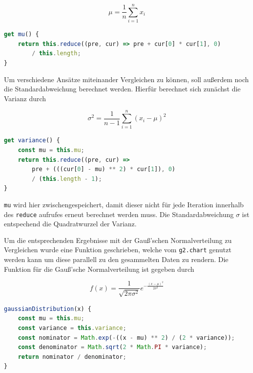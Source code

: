 \begin{equation}
    \mu = \frac{1}{n} \sum_{i=1}^n{x_i}
\end{equation}

\begin{lstlisting}[language=JavaScript, caption={Definition der \lstinline{mu} Funktion, welche den Erwartungswert der Daten in \lstinline{Data} berechnet.},label={lst:data_mu}]
get mu() {
    return this.reduce((pre, cur) => pre + cur[0] * cur[1], 0)
        / this.length;
}
\end{lstlisting}

Um verschiedene Ansätze miteinander Vergleichen zu können, soll au{\ss}erdem noch die Standardabweichung berechnet werden.
Hierfür berechnet sich zunächst die Varianz durch

\begin{equation}
    \sigma^2 = \frac{1}{n - 1} \sum_{i=1}^n(x_i - \mu)^2
\end{equation}

\begin{lstlisting}[language=JavaScript, caption={Definition der \lstinline{variance} Funktion, welche die Varianz der Daten in \lstinline{Data} berechnet}, label={lst:data_variance}]
get variance() {
    const mu = this.mu;
    return this.reduce((pre, cur) =>
        pre + (((cur[0] - mu) ** 2) * cur[1]), 0)
        / (this.length - 1);
}
\end{lstlisting}

\lstinline{mu} wird hier zwischengespeichert, damit dieser nicht für jede Iteration innerhalb des \lstinline{reduce} aufrufes erneut berechnet werden muss.
Die Standardabweichung $\sigma$ ist entspechend die Quadratwurzel der Varianz.

Um die entsprechenden Ergebnisse mit der Gau{\ss}'schen Normalverteilung zu Vergleichen wurde eine Funktion geschrieben, welche vom \lstinline{g2.chart} genutzt werden kann um diese parallell zu den gesammelten Daten zu rendern.
Die Funktion für die Gau{\ss}'sche Normalverteilung ist gegeben durch

\begin{equation}
    f(x) = \frac{1}{\sqrt{2\pi\sigma^2}}e^{-\frac{(x-\mu)^2}{2\sigma^2}}
\end{equation}

\begin{lstlisting}[language=JavaScript, caption={Definition der \lstinline{gaussianDistribution} Funktion, welche die Normalverteilung für die gegebene Varianz und den Erwartungswert formt.}, label={lst:data_gauss}]
gaussianDistribution(x) {
    const mu = this.mu;
    const variance = this.variance;
    const nominator = Math.exp(-((x - mu) ** 2) / (2 * variance));
    const denominator = Math.sqrt(2 * Math.PI * variance);
    return nominator / denominator;
}
\end{lstlisting}

